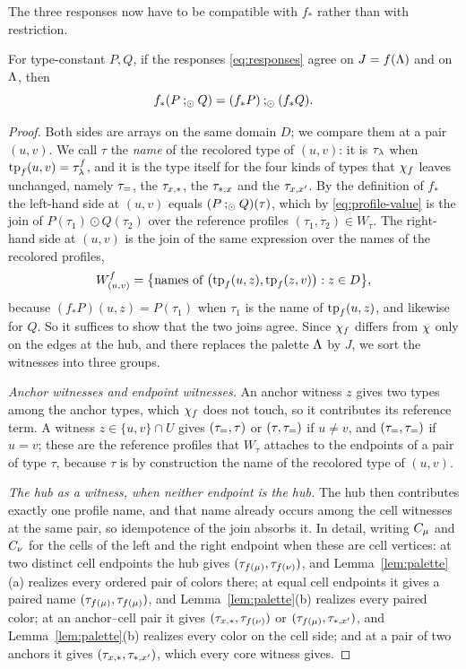 The three responses now have to be compatible with $f_\ast$ rather than
with restriction.
\begin{lemma}\label{lem:recolor}
For type-constant $P,Q$, if the responses \eqref{eq:responses} agree on
$J=f(\Lambda)$ and on $\Lambda$, then
\[
 f_\ast(P\mathbin{;_{\odot}} Q)=(f_\ast P)\mathbin{;_{\odot}}(f_\ast Q).
\]
\end{lemma}
\begin{proof}
Both sides are arrays on the same domain $D$; we compare them at a pair
$(u,v)$. We call $\tau$ the \emph{name} of the recolored type of $(u,v)$: it
is $\tau_{\lambda}$ when $\operatorname{tp}_f(u,v)=\tau_{\lambda}^f$, and it is the type
itself for the four kinds of types that $\chi_f$ leaves unchanged, namely
$\tau_{=}$, the $\tau_{x,\ast}$, the $\tau_{\ast,x}$ and the $\tau_{x,x'}$. By the definition of $f_\ast$ the
left-hand side at $(u,v)$ equals $(P\mathbin{;_{\odot}} Q)(\tau)$, which by
\eqref{eq:profile-value} is the join of $P(\tau_1)\odot Q(\tau_2)$ over the
reference profiles $(\tau_1,\tau_2)\in W_\tau$. The right-hand side at
$(u,v)$ is the join of the same expression over the names of the recolored
profiles,
\[
 W^f_{(u,v)}=\bigl\{\text{names of }
 \bigl(\operatorname{tp}_f(u,z),\operatorname{tp}_f(z,v)\bigr):z\in D\bigr\},
\]
because $(f_\ast P)(u,z)=P(\tau_1)$ when $\tau_1$ is the name of
$\operatorname{tp}_f(u,z)$, and likewise for $Q$. So it suffices to show that the two
joins agree. Since $\chi_f$ differs from $\chi$ only on the edges at the
hub, and there replaces the palette $\Lambda$ by $J$, we sort the witnesses
into three groups.

\emph{Anchor witnesses and endpoint witnesses.} An anchor witness $z$ gives
two types among the anchor types, which $\chi_f$ does not touch, so it
contributes its reference term. A witness $z\in\{u,v\}\cap U$ gives
$(\tau_{=},\tau)$ or $(\tau,\tau_{=})$ if $u\ne v$, and $(\tau_{=},\tau_{=})$ if $u=v$;
these are the reference profiles that $W_\tau$ attaches to the endpoints of
a pair of type $\tau$, because $\tau$ is by construction the name of the
recolored type of $(u,v)$.

\emph{The hub as a witness, when neither endpoint is the hub.} The hub then
contributes exactly one profile name, and that name already occurs among the
cell witnesses at the same pair, so idempotence of the join absorbs it. In
detail, writing $C_{\mu}$ and $C_{\nu}$ for the cells of the left and the
right endpoint when these are cell vertices: at two distinct cell endpoints
the hub gives
$(\tau_{f(\mu)},\tau_{f(\nu)})$, and Lemma~\ref{lem:palette}(a) realizes
every ordered pair of colors there; at equal cell endpoints it gives a
paired name $(\tau_{f(\mu)},\tau_{f(\mu)})$, and Lemma~\ref{lem:palette}(b)
realizes every paired color; at an anchor--cell pair it gives $(\tau_{x,\ast},
\tau_{f(\nu)})$ or $(\tau_{f(\mu)},\tau_{\ast,x'})$, and
Lemma~\ref{lem:palette}(b) realizes every color on the cell side; and at a
pair of two anchors it gives $(\tau_{x,\ast},\tau_{\ast,x'})$, which every core witness
gives.


\end{proof}
